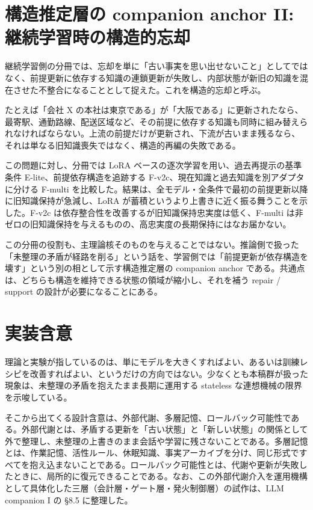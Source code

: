 \documentclass[12pt,a4paper]{article}
\begin{document}
\section{構造推定層の companion anchor II: 継続学習時の構造的忘却}\label{ux69cbux9020ux63a8ux5b9aux5c64ux306e-companion-anchor-ii-ux7d99ux7d9aux5b66ux7fd2ux6642ux306eux69cbux9020ux7684ux5fd8ux5374}

継続学習側の分冊では、忘却を単に「古い事実を思い出せないこと」としてではなく、前提更新に依存する知識の連鎖更新が失敗し、内部状態が新旧の知識を混在させた不整合になることとして捉えた。これを構造的忘却と呼ぶ。

たとえば「会社 X の本社は東京である」が「大阪である」に更新されたなら、最寄駅、通勤路線、配送区域など、その前提に依存する知識も同時に組み替えられなければならない。上流の前提だけが更新され、下流が古いまま残るなら、それは単なる旧知識喪失ではなく、構造的再編の失敗である。

この問題に対し、分冊では LoRA ベースの逐次学習を用い、過去再提示の基準条件 E-lite、前提依存構造を追跡する F-v2c、現在知識と過去知識を別アダプタに分ける F-multi を比較した。結果は、全モデル・全条件で最初の前提更新以降に旧知識保持が急減し、LoRA が蓄積というより上書きに近く振る舞うことを示した。F-v2c は依存整合性を改善するが旧知識保持忠実度は低く、F-multi は非ゼロの旧知識保持を与えるものの、高忠実度の長期保持にはなお届かない。

この分冊の役割も、主理論核そのものを与えることではない。推論側で扱った「未整理の矛盾が経路を削る」という話を、学習側では「前提更新が依存構造を壊す」という別の相として示す構造推定層の companion anchor である。共通点は、どちらも構造を維持できる状態の領域が縮小し、それを補う repair / support の設計が必要になることにある。

\section{実装含意}\label{ux5b9fux88c5ux542bux610f}

理論と実験が指しているのは、単にモデルを大きくすればよい、あるいは訓練レシピを改善すればよい、というだけの方向ではない。少なくとも本稿群が扱った現象は、未整理の矛盾を抱えたまま長期に運用する stateless な連想機械の限界を示唆している。

そこから出てくる設計含意は、外部代謝、多層記憶、ロールバック可能性である。外部代謝とは、矛盾する更新を「古い状態」と「新しい状態」の関係として外で整理し、未整理の上書きのまま会話や学習に残さないことである。多層記憶とは、作業記憶、活性ルール、休眠知識、事実アーカイブを分け、同じ形式ですべてを抱え込まないことである。ロールバック可能性とは、代謝や更新が失敗したときに、局所的に復元できることである。なお、この外部代謝介入を運用機構として具体化した三層（会計層・ゲート層・発火制御層）の試作は、LLM companion I の §8.5 に整理した。
\end{document}
